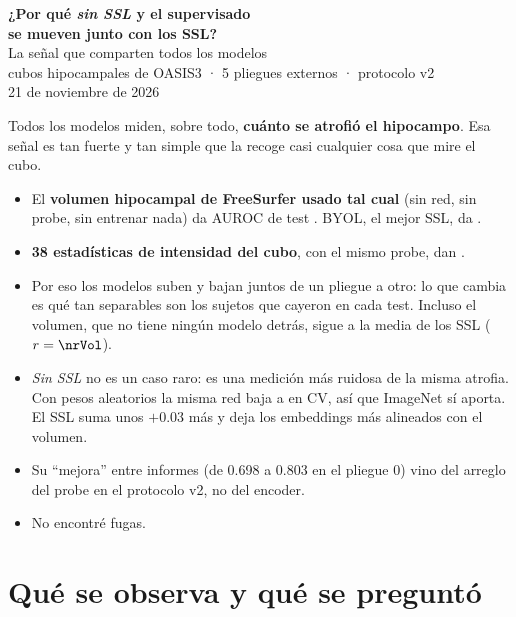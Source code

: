 \documentclass[11pt,a4paper]{article}
\begin{document}
\begin{center}
{\LARGE\bfseries\color{primaryblue} ¿Por qué \emph{sin SSL} y el supervisado\\[2pt]
se mueven junto con los SSL?}\\[8pt]
{\large\color{steelblue} La señal que comparten todos los modelos\\
cubos hipocampales de OASIS3 · 5 pliegues externos · protocolo v2}\\[6pt]
{\small 21 de noviembre de 2026}
\end{center}

\begin{tldrbox}
Todos los modelos miden, sobre todo, \textbf{cuánto se atrofió el hipocampo}. Esa
señal es tan fuerte y tan simple que la recoge casi cualquier cosa que mire el cubo.
\begin{itemize}
  \item El \textbf{volumen hipocampal de FreeSurfer usado tal cual} (sin red, sin probe,
        sin entrenar nada) da AUROC de test \nvolTest. BYOL, el mejor SSL, da \nbyolTest.
  \item \textbf{38 estadísticas de intensidad del cubo}, con el mismo probe, dan \nstatsTest.
  \item Por eso los modelos suben y bajan juntos de un pliegue a otro: lo que cambia es
        qué tan separables son los sujetos que cayeron en cada test. Incluso el volumen,
        que no tiene ningún modelo detrás, sigue a la media de los SSL ($r = \nrVol$).
  \item \emph{Sin SSL} no es un caso raro: es una medición más ruidosa de la misma
        atrofia. Con pesos aleatorios la misma red baja a \nrandCV{} en CV, así que
        ImageNet sí aporta. El SSL suma unos $+0.03$ más y deja los embeddings más
        alineados con el volumen.
  \item Su ``mejora'' entre informes (de 0.698 a 0.803 en el pliegue 0) vino del
        arreglo del probe en el protocolo v2, no del encoder.
  \item No encontré fugas.
\end{itemize}
\end{tldrbox}

\section{Qué se observa y qué se preguntó}
\end{document}
